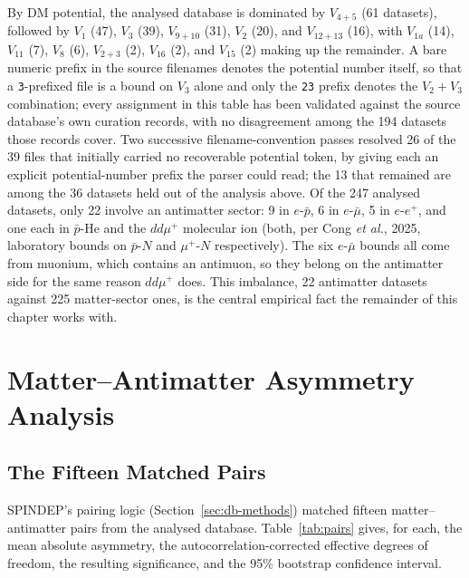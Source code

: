 By DM potential, the analysed database is dominated by $V_{4+5}$ (61
datasets), followed by $V_1$ (47), $V_3$ (39), $V_{9+10}$ (31), $V_2$
(20), and $V_{12+13}$ (16), with $V_{1a}$ (14), $V_{11}$ (7), $V_8$ (6),
$V_{2+3}$ (2), $V_{16}$ (2), and $V_{15}$ (2) making up the remainder.
A bare numeric prefix in the source filenames denotes the potential
number itself, so that a \texttt{3}-prefixed file is a bound on $V_3$
alone and only the \texttt{23} prefix denotes the $V_2+V_3$ combination;
every assignment in this table has been validated against the source
database's own curation records, with no disagreement among the 194
datasets those records cover. Two successive
filename-convention passes resolved 26 of the 39 files that initially
carried no recoverable potential token, by giving each an explicit
potential-number prefix the parser could read; the 13 that remained are
among the 36 datasets held out of the analysis above. Of the 247 analysed
datasets, only 22 involve an antimatter sector: 9 in $e$-$\bar p$, 6 in
$e$-$\bar\mu$, 5 in $e$-$e^+$, and one each in $\bar p$-He and the
$dd\mu^+$ molecular ion (both, per Cong \textit{et al.}, 2025, laboratory
bounds on $\bar p$-$N$ and $\mu^+$-$N$ respectively). The six $e$-$\bar\mu$
bounds all come from muonium, which contains an antimuon, so they belong on
the antimatter side for the same reason $dd\mu^+$ does. This imbalance, 22
antimatter datasets against 225 matter-sector ones, is the central
empirical fact the remainder of this chapter works with.

\section{Matter--Antimatter Asymmetry Analysis}
\label{sec:results-asym}

\subsection{The Fifteen Matched Pairs}

SPINDEP's pairing logic (Section~\ref{sec:db-methods}) matched fifteen
matter--antimatter pairs from the analysed database. Table~\ref{tab:pairs}
gives, for each, the mean absolute asymmetry, the autocorrelation-corrected
effective degrees of freedom, the resulting significance, and the 95\%
bootstrap confidence interval.

